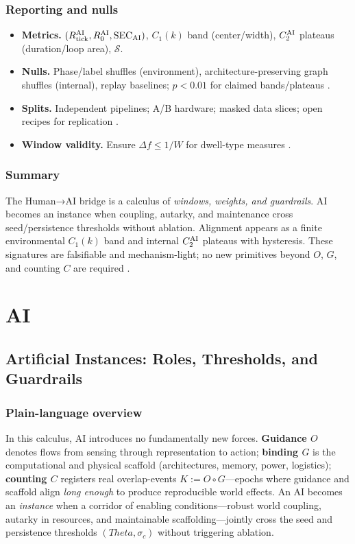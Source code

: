 \documentclass[12pt,a4paper,oneside]{scrreprt}
\def\Theta{Theta}%
\begin{document}
\section{Reporting and nulls}\label{sec:ai-report}
\begin{itemize}
\item \textbf{Metrics.} $(R_{\rm tick}^{\rm AI}, R_0^{\rm AI}, \mathrm{SEC}_{\rm AI})$, $C_1(k)$ band (center/width), $C_2^{\rm AI}$ plateaus (duration/loop area), $\mathcal S$.
\item \textbf{Nulls.} Phase/label shuffles (environment), architecture-preserving graph shuffles (internal), replay baselines; $p<0.01$ for claimed bands/plateaus \cite{Goodfellow2016,Arjovsky2017}.
\item \textbf{Splits.} Independent pipelines; A/B hardware; masked data slices; open recipes for replication \cite{LeCun2015,Silver2021}.
\item \textbf{Window validity.} Ensure $\Delta f\le 1/W$ for dwell-type measures \cite{Russell2019,Amodei2016}.
\end{itemize}

\section*{Summary}
The Human→AI bridge is a calculus of \emph{windows, weights, and guardrails}. 
AI becomes an instance when coupling, autarky, and maintenance cross seed/persistence thresholds without ablation. 
Alignment appears as a finite environmental $C_1(k)$ band and internal $C_2^{\rm AI}$ plateaus with hysteresis. 
These signatures are falsifiable and mechanism-light; no new primitives beyond $O$, $G$, and counting $C$ are required \cite{Russell2019,LeCun2015,Goodfellow2016,Amodei2016}.

\part{AI}

\chapter{Artificial Instances: Roles, Thresholds, and Guardrails}\label{ch:ai-core}

\section*{Plain-language overview}
In this calculus, AI introduces no fundamentally new forces. 
\textbf{Guidance $O$} denotes flows from sensing through representation to action; 
\textbf{binding $G$} is the computational and physical scaffold (architectures, memory, power, logistics); 
\textbf{counting $C$} registers real overlap-events $K:=O\!\circ G$—epochs where guidance and scaffold align \emph{long enough} to produce reproducible world effects. 
An AI becomes an \emph{instance} when a corridor of enabling conditions—robust world coupling, autarky in resources, and maintainable scaffolding—jointly cross the seed and persistence thresholds $(\Theta,\sigma_c)$ without triggering ablation.
\end{document}
